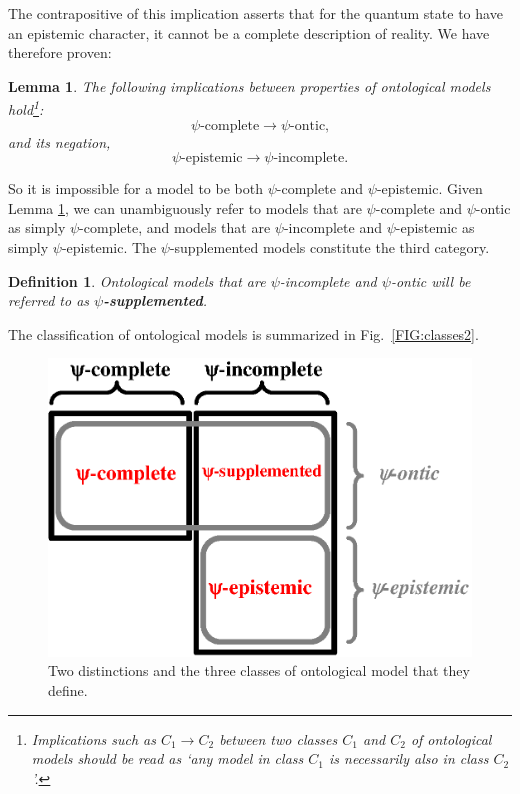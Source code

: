 \documentclass[aps,nofootinbib,12pt]{revtex4}
\newtheorem{definition}[theorem]{Definition}
\newtheorem{lemma}[theorem]{Lemma}
\begin{document}
The contrapositive of this implication asserts that for the quantum
state to have an epistemic character, it cannot be a complete
description of reality. We have therefore proven:

\begin{lemma}
The following implications between properties of ontological models
hold\footnote{Implications such as $C_{1}\rightarrow{C}_{2}$ between
two classes $C_{1}$ and $C_{2}$ of ontological models should be read
as `any model in class $C_{1}$ is necessarily also in class
$C_{2}$'.}:
\[
\psi\text{-complete}\rightarrow\psi\text{-ontic,}
\]
and its negation,
\begin{equation}
\psi\text{-epistemic}\rightarrow\psi\text{-incomplete.}
\end{equation}
\label{LEM:psi_ontic}
\end{lemma}

So it is impossible for a model to be both $\psi$-complete and $\psi
$-epistemic. Given Lemma \ref{LEM:psi_ontic}, we can unambiguously
refer to models that are $\psi$-complete and $\psi$-ontic as simply
$\psi$-complete, and models that are $\psi $-incomplete and
$\psi$-epistemic as simply $\psi$-epistemic. The $\psi
$-supplemented models constitute the third category.

\begin{definition}
Ontological models that are $\psi$-incomplete and $\psi$-ontic will be
referred to as \textbf{$\psi$-supplemented}.\label{DEF:psi_ontic_plus}
\end{definition}

The classification of ontological models is summarized in
Fig.~\ref{FIG:classes2}.

\begin{figure}[t]
\includegraphics[scale=0.5]{class_fig2}\caption{Two distinctions and the three
classes of ontological model that they define.}
\label{FIG:classes_chart}
\end{figure}
\end{document}
